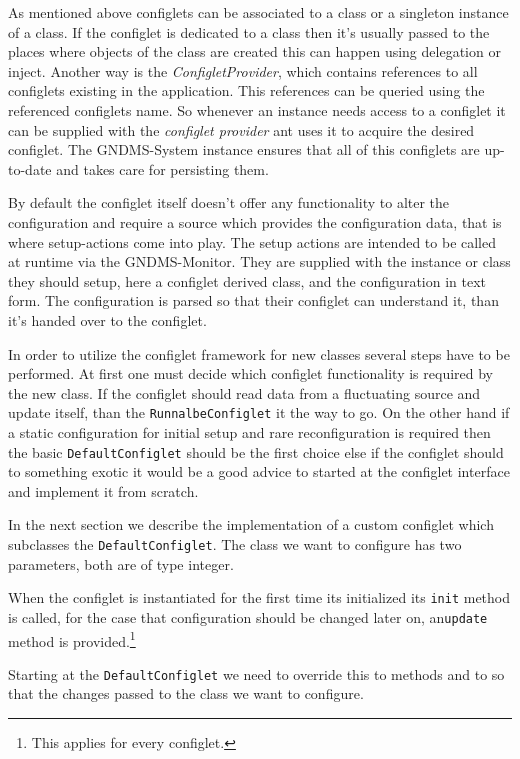 As mentioned above configlets can be associated to a class or a
singleton instance of a class. If the configlet is dedicated to a
class then it's usually passed to the places where objects of the
class are created this can happen using delegation or inject. Another
way is the \textit{ConfigletProvider}, which contains references to
all configlets existing in the application. This references can be
queried using the referenced configlets name. So whenever an instance
needs access to a configlet it can be supplied with the
\textit{configlet provider} ant uses it to acquire the desired
configlet. The GNDMS-System instance ensures that all of this
configlets are up-to-date and takes care for persisting them.

By default the configlet itself doesn't offer any functionality to
alter the configuration and require a source which provides the
configuration data, that is where setup-actions come into play. The
setup actions are intended to be called at runtime via the
GNDMS-Monitor.  They are supplied with the instance or class they
should setup, here a configlet derived class, and the configuration in
text form. The configuration is parsed so that their configlet can
understand it, than it's handed over to the configlet.

In order to utilize the configlet framework for new classes several
steps have to be performed. At first one must decide which configlet
functionality is required by the new class. If the configlet should
read data from a fluctuating source and update itself, than the
\texttt{RunnalbeConfiglet} it the way to go. On the other hand if a
static configuration for initial setup and rare reconfiguration is
required then the basic \texttt{DefaultConfiglet} should be the first
choice else if the configlet should to something exotic it would
be a good advice to started at the configlet interface and implement
it from scratch.

In the next section we describe the implementation of a custom
configlet which subclasses the \texttt{DefaultConfiglet}. The class we
want to configure has two parameters, both are of type integer.

When the configlet is instantiated for the first time its initialized
its \texttt{init} method is called, for the case that configuration
should be changed later on, an\texttt{update} method is
provided.\footnote{This applies for every configlet.}

Starting at the \texttt{DefaultConfiglet} we need to override this to
methods and to so that the changes passed to the class we want to
configure.

